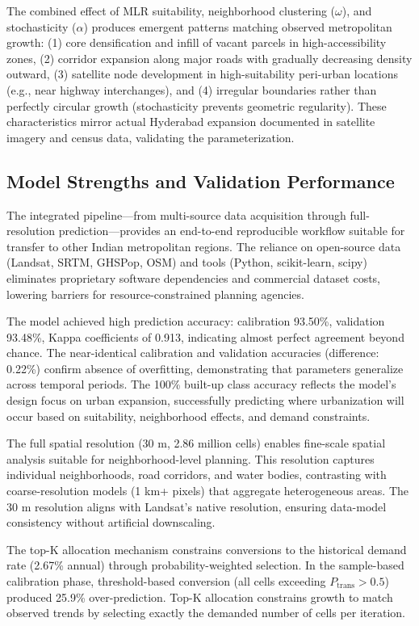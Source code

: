 \documentclass[12pt,a4paper]{article}
\begin{document}
The combined effect of MLR suitability, neighborhood clustering ($\omega$), and stochasticity ($\alpha$) produces emergent patterns matching observed metropolitan growth: (1) core densification and infill of vacant parcels in high-accessibility zones, (2) corridor expansion along major roads with gradually decreasing density outward, (3) satellite node development in high-suitability peri-urban locations (e.g., near highway interchanges), and (4) irregular boundaries rather than perfectly circular growth (stochasticity prevents geometric regularity). These characteristics mirror actual Hyderabad expansion documented in satellite imagery and census data, validating the parameterization.


\subsection{Model Strengths and Validation Performance}

The integrated pipeline—from multi-source data acquisition through full-resolution prediction—provides an end-to-end reproducible workflow suitable for transfer to other Indian metropolitan regions. The reliance on open-source data (Landsat, SRTM, GHSPop, OSM) and tools (Python, scikit-learn, scipy) eliminates proprietary software dependencies and commercial dataset costs, lowering barriers for resource-constrained planning agencies.

The model achieved high prediction accuracy: calibration 93.50\%, validation 93.48\%, Kappa coefficients of 0.913, indicating almost perfect agreement beyond chance. The near-identical calibration and validation accuracies (difference: 0.22\%) confirm absence of overfitting, demonstrating that parameters generalize across temporal periods. The 100\% built-up class accuracy reflects the model's design focus on urban expansion, successfully predicting where urbanization will occur based on suitability, neighborhood effects, and demand constraints.

The full spatial resolution (30 m, 2.86 million cells) enables fine-scale spatial analysis suitable for neighborhood-level planning. This resolution captures individual neighborhoods, road corridors, and water bodies, contrasting with coarse-resolution models (1 km+ pixels) that aggregate heterogeneous areas. The 30 m resolution aligns with Landsat's native resolution, ensuring data-model consistency without artificial downscaling.

The top-K allocation mechanism constrains conversions to the historical demand rate (2.67\% annual) through probability-weighted selection. In the sample-based calibration phase, threshold-based conversion (all cells exceeding $P_{\text{trans}} > 0.5$) produced 25.9\% over-prediction. Top-K allocation constrains growth to match observed trends by selecting exactly the demanded number of cells per iteration.
\end{document}
